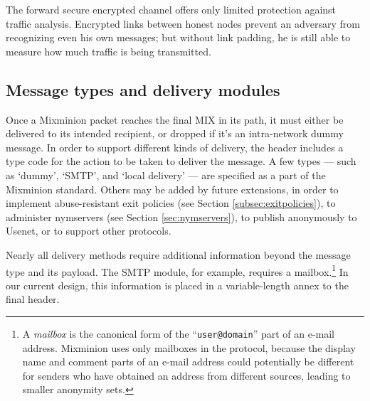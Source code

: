 \documentclass{llncs}
\begin{document}
The forward secure encrypted channel offers only limited protection
against traffic analysis. Encrypted links between honest nodes prevent
an adversary from recognizing even his own messages; but without
link padding, he is still able to measure how much traffic is being
transmitted.

\subsection{Message types and delivery modules}
\label{subsec:delivery-modules}

Once a Mixminion packet reaches the final MIX in its path, it must
either be delivered to its intended recipient, or dropped if it's an
intra-network dummy message. In order to support different kinds of
delivery, the header includes a type code for the action to be taken
to deliver the message.  A few types --- such as `dummy', `SMTP', and `local
delivery' --- are specified as a part of the Mixminion standard.  Others
may be added by future extensions, in order to implement
abuse-resistant exit policies (see Section \ref{subsec:exitpolicies}),
to administer nymservers (see Section \ref{sec:nymservers}), to publish
anonymously to Usenet, or to support other protocols.

Nearly all delivery methods require additional information beyond the
message type and its payload.  The SMTP module, for example, requires
a mailbox.\footnote{A {\it mailbox} is the canonical form of the
``{\tt user@domain}'' part of an e-mail address. Mixminion uses only
mailboxes in the protocol, because the display name and comment parts
of an e-mail address could potentially be different for senders who
have obtained an address from different sources, leading to smaller
anonymity sets.}
In our current design, this information is placed
in a variable-length annex to the final header.

%
%
\end{document}
